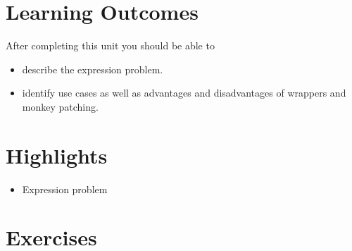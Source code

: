 \documentclass[11pt,a4paper]{article}
\begin{document}
\section{Learning Outcomes}

After completing this unit you should be able to

\begin{itemize}
    \item describe the expression problem.
    \item identify use cases as well as advantages and disadvantages of wrappers and monkey patching.
\end{itemize}

\section{Highlights}

\begin{itemize}
    \item Expression problem
\end{itemize}



\section{Exercises}
\end{document}
